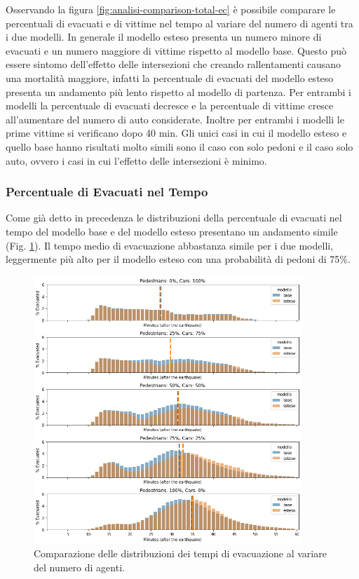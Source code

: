 Osservando la figura \ref{fig:analisi-comparison-total-ec} è possibile comparare le percentuali di evacuati e di vittime nel tempo al variare del numero di agenti tra i due modelli.
In generale il modello esteso presenta un numero minore di evacuati e un numero maggiore di vittime rispetto al modello base.
Questo può essere sintomo dell'effetto delle intersezioni che creando rallentamenti causano una mortalità maggiore,
infatti la percentuale di evacuati del modello esteso presenta un andamento più lento rispetto al modello di partenza.
Per entrambi i modelli la percentuale di evacuati decresce e la percentuale di vittime cresce all'aumentare del numero di auto considerate.
Inoltre per entrambi i modelli le prime vittime si verificano dopo 40 min.
Gli unici casi in cui il modello esteso e quello base hanno risultati molto simili sono il caso con solo pedoni e il caso solo auto,
ovvero i casi in cui l'effetto delle intersezioni è minimo.

\pagebreak

\subsubsection*{Percentuale di Evacuati nel Tempo}

Come già detto in precedenza le distribuzioni della percentuale di evacuati nel tempo del modello base e del modello esteso
presentano un andamento simile (Fig. \ref{fig:analisi-comparison-evtimes}). Il tempo medio di evacuazione abbastanza simile per i due modelli,
leggermente più alto per il modello esteso con una probabilità di pedoni di 75\%.

\begin{figure}[ht]
    \centering
    \includegraphics[width=0.9\textwidth]{images/analisi/comparison-evtimes.png}
    \caption{Comparazione delle distribuzioni dei tempi di evacuazione al variare del numero di agenti.}
    \label{fig:analisi-comparison-evtimes}
\end{figure}

